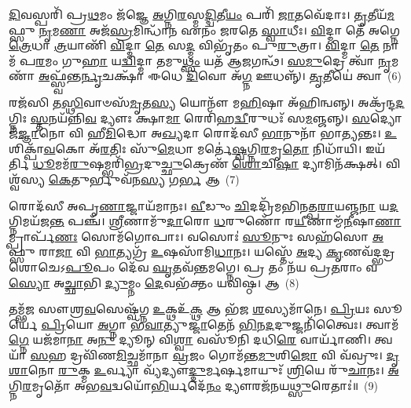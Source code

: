 \-\ul{𑌦𑌿}\-𑌵𑌸𑍍𑌪𑌰𑌿᳴ 𑌪𑍍𑌰\-\ul{𑌥}\-𑌮𑌂 𑌜᳴𑌜𑍍𑌞𑍇 \ul{𑌅}\-𑌗𑍍𑌨𑌿\-\ul{𑌰}\-𑌸𑍍𑌮\-\ul{𑌦𑍍𑌦𑍍𑌵𑌿}\-𑌤𑍀\-\ul{𑌯𑌂} 𑌪𑌰𑌿᳴ \ul{𑌜𑌾}\-𑌤𑌵𑍇᳴𑌦𑌾𑌃। \ul{𑌤𑍃}\-𑌤𑍀𑌯᳴\-\ul{𑌮}\-𑌫𑍍𑌸𑍁 \ul{𑌨𑍃}\-𑌮\-\ul{𑌣𑌾} 𑌅𑌜᳴\-\ul{𑌸𑍍𑌰}\-𑌮𑌿𑌨𑍍𑌧𑌾᳴𑌨 𑌏𑌨𑌂 𑌜𑌰𑌤𑍇 \ul{𑌸𑍍𑌵𑌾}\-𑌧𑍀𑌃। \ul{𑌵𑌿}\-𑌦𑍍𑌮𑌾 𑌤𑍇᳴ 𑌅𑌗𑍍𑌨𑍇 \ul{𑌤𑍍𑌰𑍇}\-𑌧𑌾 \ul{𑌤𑍍𑌰}\-𑌯𑌾𑌣𑌿᳴ \ul{𑌵𑌿}\-𑌦𑍍𑌮𑌾 \ul{𑌤𑍇} 𑌸\-\ul{𑌦𑍍𑌮} 𑌵𑌿𑌭𑍃᳴𑌤𑌂 𑌪𑍁\-\ul{𑌰𑍁}\-𑌤𑍍𑌰𑌾। \ul{𑌵𑌿}\-𑌦𑍍𑌮𑌾 \ul{𑌤𑍇} 𑌨𑌾𑌮᳴ 𑌪\-\ul{𑌰}\-𑌮𑌂 𑌗𑍁\-\ul{𑌹𑌾} 𑌯\-\ul{𑌦𑍍𑌵𑌿}\-𑌦𑍍𑌮𑌾 𑌤𑌮𑍁\-\ul{𑌥𑍍𑌸𑌂} 𑌯𑌤᳴ 𑌆\-\ul{𑌜}\-𑌗𑌨𑍍𑌥᳴। \ul{𑌸}\-\-\ul{𑌮𑍁}\-𑌦𑍍𑌰𑍇 𑌤𑍍𑌵𑌾᳴ \ul{𑌨𑍃}\-𑌮𑌣𑌾᳴ \ul{𑌅}\-𑌫𑍍𑌸𑍍𑌵᳴𑌨𑍍𑌤\-\ul{𑌰𑍍𑌨𑍃}\-𑌚𑌕𑍍𑌷𑌾᳴ 𑌈𑌧𑍇 \ul{𑌦𑌿}\-𑌵𑍋 𑌅᳴\-\ul{𑌗𑍍𑌨} 𑌊𑌧𑌨𑍍𑌨𑍍᳴। \ul{𑌤𑍃}\-𑌤𑍀𑌯𑍇॑ 𑌤𑍍𑌵𑌾~(6)

𑌰𑌜᳴𑌸𑌿 𑌤\-\ul{𑌸𑍍𑌥𑌿}\-𑌵𑌾𑍞𑌸᳴\-\ul{𑌮𑍃}\-𑌤\-\ul{𑌸𑍍𑌯} 𑌯𑍋𑌨𑍗᳴ 𑌮\-\ul{𑌹𑌿}\-𑌷𑌾 𑌅᳴𑌹𑌿𑌨𑍍𑌵𑌨𑍍𑌨𑍍। 𑌅𑌕𑍍𑌰᳴𑌨𑍍𑌦\-\ul{𑌦}\-𑌗𑍍𑌨𑌿𑌃 \ul{𑌸𑍍𑌤}\-𑌨𑌯᳴𑌨𑍍𑌨𑌿\-\ul{𑌵} 𑌦𑍍𑌯𑍗𑌃 𑌕𑍍𑌷𑌾\-\ul{𑌮𑌾} 𑌰𑍇𑌰𑌿᳴𑌹\-\ul{𑌦𑍍𑌵𑍀}\-𑌰𑍁𑌧𑌃᳴ 𑌸\-\ul{𑌮}\-𑌞𑍍𑌜𑌨𑍍𑌨𑍍। \ul{𑌸}\-𑌦𑍍𑌯𑍋 𑌜᳴\-\ul{𑌜𑍍𑌞𑌾}\-𑌨𑍋 𑌵𑌿 𑌹𑍀\-\ul{𑌮𑌿}\-𑌦𑍍𑌧𑍋 𑌅\-\ul{𑌖𑍍𑌯}\-𑌦𑌾 𑌰𑍋𑌦᳴𑌸𑍀 \ul{𑌭𑌾}\-𑌨𑍁𑌨𑌾᳴ 𑌭𑌾\-\ul{𑌤𑍍𑌯}\-𑌨𑍍𑌤𑌃। \ul{𑌉}\-𑌶𑌿𑌕𑍍𑌪𑌾᳴\-\ul{𑌵}\-𑌕𑍋 𑌅᳴\-\ul{𑌰}\-𑌤𑌿𑌃 𑌸𑍁᳴\-\ul{𑌮𑍇}\-𑌧𑌾 𑌮𑌰𑍍𑌤𑍇॑\-\ul{𑌷𑍍𑌵}\-𑌗𑍍𑌨𑌿\-\ul{𑌰}\-𑌮𑍃\-\ul{𑌤𑍋} 𑌨𑌿𑌧𑌾᳴𑌯𑌿। 𑌇𑌯᳴𑌰𑍍𑌤𑌿 \ul{𑌧𑍂}\-𑌮𑌮᳴\-\ul{𑌰𑍁}\-𑌷𑌮𑍍𑌭𑌰𑌿᳴\-\ul{𑌭𑍍𑌰}\-𑌦𑍁\-\ul{𑌚𑍍𑌛𑍁}\-𑌕𑍍𑌰𑍇𑌣᳴ \ul{𑌶𑍋}\-𑌚𑌿\-\ul{𑌷𑌾} 𑌦𑍍𑌯𑌾𑌮𑌿𑌨᳴𑌕𑍍𑌷𑌤𑍍। 𑌵𑌿𑌶𑍍𑌵᳴𑌸𑍍𑌯 \ul{𑌕𑍇}\-𑌤𑍁𑌰𑍍𑌭𑍁𑌵᳴𑌨\-\ul{𑌸𑍍𑌯} 𑌗\-\ul{𑌰𑍍𑌭} 𑌆~(7)

𑌰𑍋𑌦᳴𑌸𑍀 𑌅𑌪𑍃\-\ul{𑌣𑌾}\-𑌜𑍍𑌜𑌾𑌯᳴𑌮𑌾𑌨𑌃। \ul{𑌵𑍀}\-𑌡𑍁𑌂 \ul{𑌚𑌿}\-𑌦𑌦𑍍𑌰𑌿᳴𑌮𑌭𑌿𑌨𑌤𑍍𑌪\-\ul{𑌰𑌾}\-𑌯𑌞𑍍𑌜\-\ul{𑌨𑌾} 𑌯\-\ul{𑌦}\-𑌗𑍍𑌨𑌿𑌮𑌯᳴𑌜\-\ul{𑌨𑍍𑌤} 𑌪𑌞𑍍𑌚᳴। \ul{𑌶𑍍𑌰𑍀}\-𑌣𑌾𑌮𑍁᳴\-\ul{𑌦𑌾}\-𑌰𑍋 \ul{𑌧}\-𑌰𑍁𑌣𑍋᳴ 𑌰\-\ul{𑌯𑍀}\-𑌣𑌾𑌮𑍍𑌮᳴\-\ul{𑌨𑍀}\-𑌷𑌾\-\ul{𑌣𑌾}\-𑌮𑍍𑌪𑍍𑌰𑌾𑌰𑍍𑌪᳴\-\ul{𑌣𑌃} 𑌸𑍋𑌮᳴𑌗𑍋𑌪𑌾𑌃। 𑌵𑌸𑍋𑌃॑ \ul{𑌸𑍂}\-𑌨𑍁𑌃 𑌸𑌹᳴𑌸𑍋 \ul{𑌅}\-𑌫𑍍𑌸𑍁 𑌰𑌾\-\ul{𑌜𑌾} 𑌵𑌿 \ul{𑌭𑌾}\-𑌤𑍍𑌯𑌗𑍍𑌰᳴ \ul{𑌉}\-𑌷𑌸𑌾᳴𑌮𑌿\-\ul{𑌧𑌾}\-𑌨𑌃। 𑌯𑌸𑍍𑌤𑍇᳴ \ul{𑌅}\-𑌦𑍍𑌯 \ul{𑌕𑍃}\-𑌣𑌵᳴𑌦𑍍𑌭𑌦𑍍𑌰𑌶𑍋𑌚𑍇\-𑌽\-\ul{𑌪𑍂}\-𑌪𑌂 𑌦𑍇᳴𑌵 \ul{𑌘𑍃}\-𑌤𑌵᳴𑌨𑍍𑌤𑌮𑌗𑍍𑌨𑍇। 𑌪𑍍𑌰 𑌤𑌂 𑌨᳴𑌯 𑌪𑍍𑌰\-\ul{𑌤}\-𑌰𑌾𑌂 𑌵\-\ul{𑌸𑍍𑌯𑍋} 𑌅\-\ul{𑌚𑍍𑌛𑌾}\-𑌭𑌿 \ul{𑌦𑍍𑌯𑍁}\-𑌮𑍍𑌨𑌂 \ul{𑌦𑍇}\-𑌵𑌭᳴𑌕𑍍𑌤𑌂 𑌯𑌵𑌿𑌷𑍍𑌠। 𑌆~(8)

𑌤𑌮𑍍𑌭᳴𑌜 𑌸𑍗𑌶𑍍𑌰\-\ul{𑌵}\-𑌸𑍇𑌷𑍍𑌵᳴𑌗𑍍𑌨 \ul{𑌉}\-𑌕𑍍𑌥𑌉᳴\-\ul{𑌕𑍍𑌥} 𑌆 𑌭᳴𑌜 \ul{𑌶}\-𑌸𑍍𑌯𑌮𑌾᳴𑌨𑍇। \ul{𑌪𑍍𑌰𑌿}\-𑌯𑌃 𑌸𑍂𑌰𑍍𑌯𑍇॑ \ul{𑌪𑍍𑌰𑌿}\-𑌯𑍋 \ul{𑌅}\-𑌗𑍍𑌨𑌾 𑌭᳴\-\ul{𑌵𑌾}\-𑌤𑍍𑌯𑍁\-\ul{𑌜𑍍𑌜𑌾}\-𑌤𑍇𑌨᳴ \ul{𑌭𑌿}\-𑌨\-\ul{𑌦}\-𑌦𑍁𑌜𑍍𑌜𑌨𑌿᳴𑌤𑍍𑌵𑍈𑌃। 𑌤𑍍𑌵𑌾𑌮᳴\-\ul{𑌗𑍍𑌨𑍇} 𑌯𑌜᳴𑌮𑌾\-\ul{𑌨𑌾} 𑌅\-\ul{𑌨𑍁} 𑌦𑍍𑌯𑍂𑌨𑍍 𑌵𑌿\-\ul{𑌶𑍍𑌵𑌾} 𑌵𑌸𑍂᳴𑌨𑌿 𑌦𑌧𑌿\-\ul{𑌰𑍇} 𑌵𑌾𑌰𑍍𑌯𑌾᳴𑌣𑌿। 𑌤𑍍𑌵𑌯𑌾᳴ \ul{𑌸}\-𑌹 𑌦𑍍𑌰𑌵𑌿᳴𑌣\-\ul{𑌮𑌿}\-𑌚𑍍𑌛𑌮𑌾᳴𑌨𑌾 \ul{𑌵𑍍𑌰}\-𑌜𑌂 𑌗𑍋𑌮᳴𑌨𑍍𑌤\-\ul{𑌮𑍁}\-𑌶𑌿\-\ul{𑌜𑍋} 𑌵𑌿 𑌵᳴𑌵𑍍𑌰𑍁𑌃। \ul{𑌦𑍃}\-\-\ul{𑌶𑌾}\-𑌨𑍋 \ul{𑌰𑍁}\-𑌕𑍍𑌮 \ul{𑌉}\-𑌰𑍍𑌵𑍍𑌯𑌾 𑌵𑍍𑌯᳴𑌦𑍍𑌯𑍗\-\ul{𑌦𑍍𑌦𑍁}\-𑌰𑍍𑌮𑌰𑍍\mbox{}\-\ul{𑌷}\-𑌮𑌾𑌯𑍁𑌃᳴ \ul{𑌶𑍍𑌰𑌿}\-𑌯𑍇 𑌰𑍁᳴\-\ul{𑌚𑌾}\-𑌨𑌃। \ul{𑌅}\-𑌗𑍍𑌨𑌿\-\ul{𑌰}\-𑌮𑍃𑌤𑍋᳴ 𑌅𑌭\-\ul{𑌵}\-𑌦𑍍𑌵𑌯𑍋᳴\-\ul{𑌭𑌿}\-𑌰𑍍𑌯𑌦𑍇᳴\-\ul{𑌨𑌂} 𑌦𑍍𑌯𑍗𑌰𑌜᳴𑌨𑌯\-\ul{𑌥𑍍𑌸𑍁}\-𑌰𑍇𑌤𑌾𑌃॑॥~(9)

{\anuvakamend[{\-\ul{𑌤𑍃}\-𑌤𑍀𑌯𑍇॑ \ul{𑌤𑍍𑌵𑌾} 𑌗\-\ul{𑌰𑍍𑌭} 𑌆 𑌯᳴\-\ul{𑌵𑌿}\-𑌷𑍍𑌠𑌾 𑌯\-\ul{𑌚𑍍𑌚}\-𑌤𑍍𑌵𑌾𑌰𑌿᳴ 𑌚}]}%

